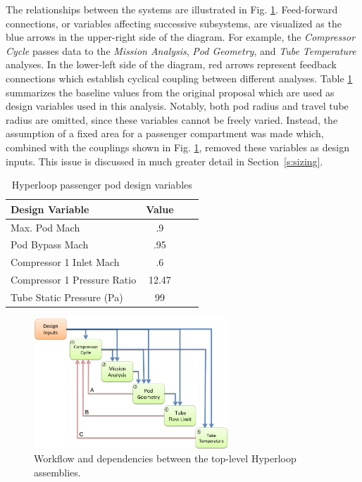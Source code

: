 \documentclass[heading.tex]{subfiles}
\begin{document}
The relationships between the systems are illustrated in Fig. \ref{f:hyperloopXDSM}. 
Feed-forward connections, or variables affecting successive subsystems,
are visualized as the blue arrows in the upper-right side of the diagram.
For example, the \textit{Compressor Cycle} passes data to the \textit{Mission Analysis},
\textit{Pod Geometry}, and \textit{Tube Temperature} analyses.
In the lower-left side of the diagram, red arrows represent feedback connections which establish cyclical coupling between different analyses.
Table \ref{tab:desvars} summarizes the baseline values from the original proposal which are used as design variables used in this analysis.
Notably, both pod radius and travel tube radius are omitted, since these variables cannot be freely varied.
Instead, the assumption of a fixed area for a passenger compartment was made which,
combined with the couplings shown in Fig. \ref{f:hyperloopXDSM}, removed these variables as design inputs.
This issue is discussed in much greater detail in Section~\ref{s:sizing}.

\begin{table}
    \centering
    \caption{Hyperloop passenger pod design variables}
    \label{tab:desvars}
    \begin{tabular}{l  c  c  c} 
        \hline
        Design Variable &  Value\\ \hline 
        Max. Pod Mach & .9 \\ 
        Pod Bypass Mach & .95\\
        Compressor 1 Inlet Mach & .6\\ 
        Compressor 1 Pressure Ratio & 12.47\\ 
        Tube Static Pressure (Pa) & 99 \\ \hline
    \end{tabular}
\end{table}

\begin{figure}[hbtp]
\centering
\includegraphics[width=0.65\textwidth]{images/TopAssembly.png}
\caption{Workflow and dependencies between the top-level Hyperloop assemblies.}
\label{f:hyperloopXDSM}
\end{figure}
\end{document}
